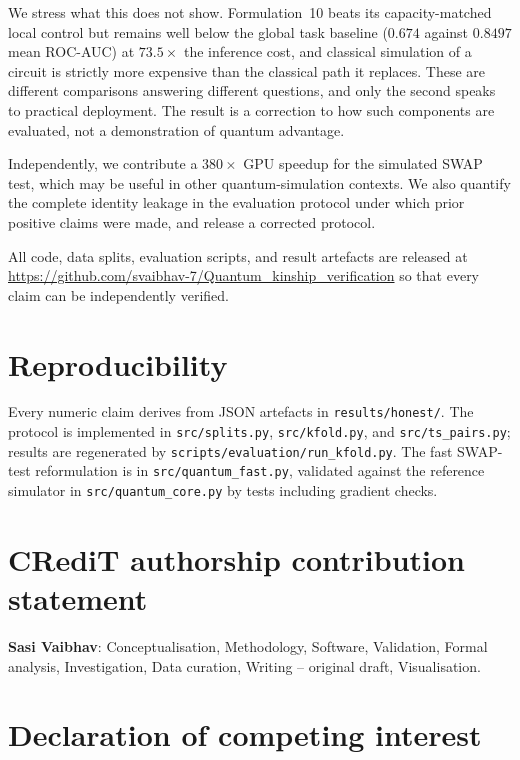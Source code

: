 \documentclass[preprint,12pt]{elsarticle}
\begin{document}
We stress what this does not show. Formulation~10 beats its capacity-matched
local control but remains well below the global task baseline
($0.674$ against $0.8497$ mean ROC-AUC) at $73.5\times$ the inference cost, and
classical simulation of a circuit is strictly more expensive than the classical
path it replaces. These are different comparisons answering different
questions, and only the second speaks to practical deployment. The result is a
correction to how such components are evaluated, not a demonstration of
quantum advantage.

Independently, we contribute a $380\times$ GPU speedup for the simulated
SWAP test, which may be useful in other quantum-simulation contexts. We
also quantify the complete identity leakage in the evaluation protocol under
which prior positive claims were made, and release a corrected protocol.

All code, data splits, evaluation scripts, and result artefacts are released
at \url{https://github.com/svaibhav-7/Quantum_kinship_verification} so that
every claim can be independently verified.

\section*{Reproducibility}

Every numeric claim derives from JSON artefacts in \texttt{results/honest/}.
The protocol is implemented in \texttt{src/splits.py}, \texttt{src/kfold.py},
and \texttt{src/ts\_pairs.py}; results are regenerated by
\texttt{scripts/evaluation/run\_kfold.py}. The fast SWAP-test reformulation
is in \texttt{src/quantum\_fast.py}, validated against the reference
simulator in \texttt{src/quantum\_core.py} by tests including gradient
checks.

\section*{CRediT authorship contribution statement}

\textbf{Sasi Vaibhav}: Conceptualisation, Methodology, Software, Validation,
Formal analysis, Investigation, Data curation, Writing -- original draft,
Visualisation.

\section*{Declaration of competing interest}
\end{document}
